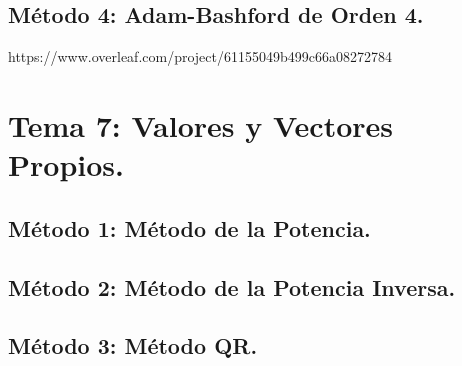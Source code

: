 \documentclass[10pt]{article}
\begin{document}
\newpage

\subsection{Método 4: Adam-Bashford de Orden 4.}

\UseRawInputEncoding



\newpage
https://www.overleaf.com/project/61155049b499c66a08272784
\section{Tema 7: Valores y Vectores Propios.}

\subsection{Método 1: Método de la Potencia.}

\UseRawInputEncoding


\subsection{Método 2: Método de la Potencia Inversa.}

\UseRawInputEncoding



\subsection{Método 3: Método QR.}

\UseRawInputEncoding

\end{document}
